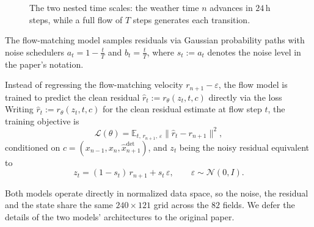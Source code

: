 \begin{figure}[H]
\centering
{}
\caption{The two nested time scales: the weather time $n$ advances in $24$\,h steps, while a full flow of $T$ steps generates each transition.}
\label{fig:time-scales}
\end{figure}

The flow-matching model samples residuals via Gaussian probability paths with noise schedulers $a_t = 1-\frac{t}{T}$ and $b_t=\frac{t}{T}$,
where $s_t:=a_t$ denotes the noise level in the paper's notation.

Instead of regressing the flow-matching velocity $r_{n+1}-\varepsilon$, the flow model is trained to predict the clean residual $\hat{r}_t := r_\theta(z_t,t,c)$ directly via the loss
Writing $\hat{r}_t := r_\theta(z_t,t,c)$ for the clean residual estimate at flow step $t$, the training objective is
$$
    \mathcal{L}(\theta) = \mathbb{E}_{t,\,r_{n+1},\,\varepsilon}\big\lVert \hat{r}_t - r_{n+1} \big\rVert^2,
$$
conditioned on $c=(x_{n-1},x_n,\hat{x}^{\text{det}}_{n+1})$, and $z_t$ being the noisy residual equivalent to 
$$
    z_t = (1-s_t)\,r_{n+1} + s_t\,\varepsilon, \qquad \varepsilon\sim\mathcal{N}(0,I).
$$


Both models operate directly in normalized data space, so the noise, the residual and the state share the same $240 \times 121$ grid across the $82$ fields.
We defer the details of the two models' architectures to the original paper.

